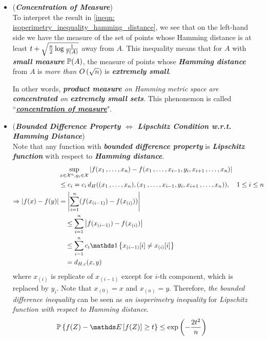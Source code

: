 \documentclass[11pt]{article}
\begin{document}
\begin{itemize}
\item \begin{remark} (\textbf{\emph{Concentration of Measure}})\\
To interpret the result in \eqref{ineqn: isoperimetry_inequality_hamming_distance}, we see that on the left-hand side we have the measure of the set of points whose Hamming distance is at least $t + \sqrt{\frac{n}{2}\log \frac{1}{{\mathbb P}(A)}}$ away from $A$. This inequality means that for $A$ with \emph{\textbf{small measure}} ${\mathbb P}(A)$, the measure of points whose \emph{\textbf{Hamming distance}} from $A$ is \emph{more than} $O\left(\sqrt{n}\right)$ is \emph{\textbf{extremely small}}.

In other words, \emph{\textbf{product measure} on Hamming metric space are \textbf{concentrated} on \textbf{extremely small sets}}. This phenonemon is called ``\underline{\textbf{\emph{concentration of measure}}}". 
\end{remark}

\item \begin{example} (\textbf{\emph{Bounded Difference Property $\Leftrightarrow$ Lipschitz Condition w.r.t. Hamming Distance}}) \\
Note that any  function with \emph{\textbf{bounded difference property}} is \emph{\textbf{Lipschitz function}} with respect to \emph{\textbf{Hamming distance}}. 
\begin{align*}
&\sup_{x \in \cX^n, y_i \in \cX}\abs{f(x_1 \xdotx{,} x_n) - f(x_1 \xdotx{,} x_{i-1}, y_i, x_{i+1} \xdotx{,} x_{n})} &\\
&\le c_i = c_i\,d_{H}((x_1 \xdotx{,} x_n), (x_1 \xdotx{,} x_{i-1}, y_i, x_{i+1} \xdotx{,} x_{n})), \quad 1\le i \le n\\
\Rightarrow \abs{f(x) - f(y)} &=  \abs{\sum_{i=1}^{n}(f(x_{(i-1)}) - f(x_{(i)}) )}\\
&\quad \le  \sum_{i=1}^{n}\abs{f(x_{(i-1)}) - f(x_{(i)}) }\\
&\quad \le \sum_{i=1}^{n}c_i \ind{x_{(i-1)}[i] \neq x_{(i)}[i]} \\
&\quad = d_{H,c}(x, y)
\end{align*}   where $x_{(i)}$ is replicate of $x_{(i-1)}$ except for $i$-th component, which is replaced by $y_i$. Note that $x_{(0)} = x$ and $x_{(n)} = y$. 
Therefore, \emph{the bounded difference inequality} can be seen as \emph{an isoperimetry inequality} for \emph{Lipschitz function with respect to Hamming distance}.
\begin{align*}
 \bP\set{f(Z) - \E{}{f(Z)} \ge t } &\le \exp\paren{-\frac{2t^2}{n}}
\end{align*}
\end{example}


\end{itemize}
\end{document}
